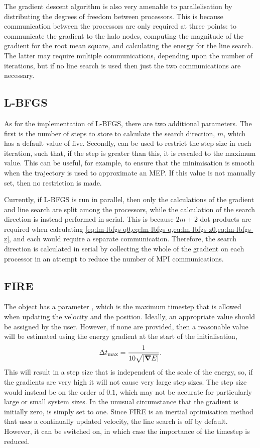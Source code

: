 The gradient descent algorithm is also very amenable to parallelisation by distributing the degrees of freedom between processors.
This is because communication between the processors are only required at three points: to communicate the gradient to the halo nodes, computing the magnitude of the gradient for the root mean square, and calculating the energy for the line search.
The latter may require multiple communications, depending upon the number of iterations, but if no line search is used then just the two communications are necessary.

\subsection{L-BFGS}
As for the implementation of L-BFGS, there are two additional parameters.
The first is the number of steps to store to calculate the search direction, $m$, which has a default value of five.
Secondly,  can be used to restrict the step size in each iteration, such that, if the step is greater than this, it is rescaled to the maximum value.
This can be useful, for example, to ensure that the minimisation is smooth when the trajectory is used to approximate an MEP.
If this value is not manually set, then no restriction is made.

Currently, if L-BFGS is run in parallel, then only the calculations of the gradient and line search are split among the processors, while the calculation of the search direction is instead performed in serial.
This is because $2m+2$ dot products are required when calculating \cref{eq:lm-lbfgs-q0,eq:lm-lbfgs-q,eq:lm-lbfgs-z0,eq:lm-lbfgs-z}, and each would require a separate communication.
Therefore, the search direction is calculated in serial by collecting the whole of the gradient on each processor in an attempt to reduce the number of MPI communications.

\subsection{FIRE}
The  object has a parameter , which is the maximum timestep that is allowed when updating the velocity and the position.
Ideally, an appropriate value should be assigned by the user.
However, if none are provided, then a reasonable value will be estimated using the energy gradient at the start of the initialisation,
\begin{equation}
  \Delta t_\text{max} = \frac{1}{10 \sqrt{\left| \bm{\nabla} E \right|}}.
\end{equation}
This will result in a step size that is independent of the scale of the energy, so, if the gradients are very high it will not cause very large step sizes.
The step size would instead be on the order of $0.1$, which may not be accurate for particularly large or small system sizes.
In the unusual circumstance that the gradient is initially zero,  is simply set to one.
Since FIRE is an inertial optimisation method that uses a continually updated velocity, the line search is off by default.
However, it can be switched on, in which case the importance of the timestep is reduced.

